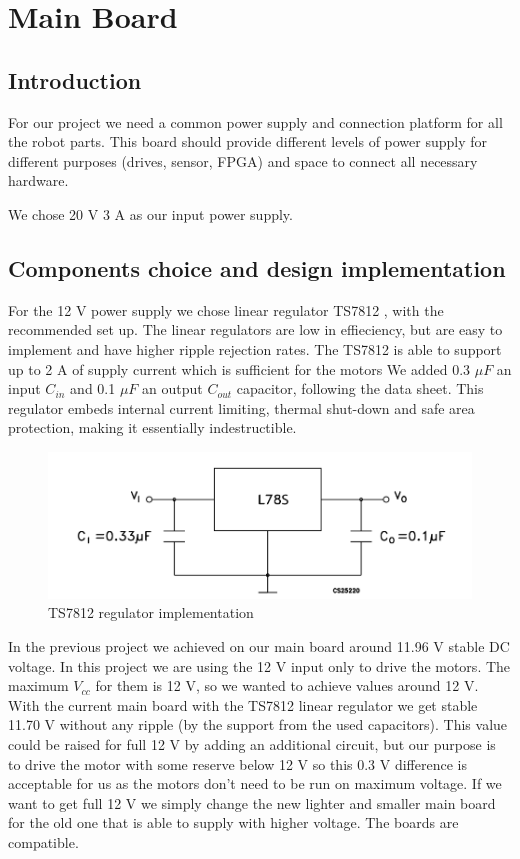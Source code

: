 \chapter{Main Board}
\section{Introduction}
For our project we need a common power supply and connection platform for all the robot parts. This board should provide different levels of power supply for different purposes (drives, sensor, FPGA) and space  to connect all necessary hardware.

We chose 20 V 3 A as our input power supply. 

\section{Components choice and design implementation}

 For the 12 V power supply we chose linear regulator TS7812 \cite{linear_regulator}, with the recommended set up. The linear regulators are low in effieciency, but are easy to implement and have higher ripple rejection rates. The TS7812 is able to support up to 2 A of supply current which is sufficient for the motors We added 0.3 $\mu F$ an input $C_{in}$ and 0.1  $\mu F$ an output $C_{out}$ capacitor, following the data sheet. This regulator embeds internal current limiting, thermal shut-down and safe area protection, making it essentially indestructible.

\begin{figure}[!ht]
	\centering
	\includegraphics[width=1.0\textwidth]{figures/linear_regulator}
	\caption{TS7812 regulator implementation}
	\label{fig:linear_reg}
\end{figure}
 
  In the previous project we achieved on our main board around 11.96 V stable DC voltage. In this project we are using the 12 V input only to drive the motors. The maximum $V_{cc}$ for them is 12 V, so we wanted to achieve values around 12 V. With the current main board with the TS7812 linear regulator we get stable 11.70 V without any ripple (by the support from the used capacitors). This value could be raised for full 12 V by adding an additional circuit, but our purpose is to drive the motor with some reserve below 12 V so this 0.3 V difference is acceptable for us as the motors don't need to be run on maximum voltage. If we want to get full 12 V we simply change the new lighter and smaller main board for the old one that is able to supply with higher voltage. The boards are compatible. 
 
